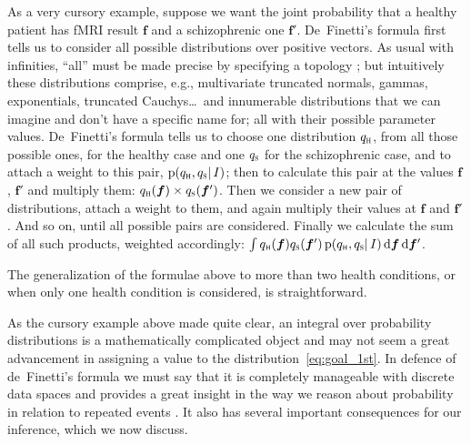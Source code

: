 \documentclass[%
]{frontiersSCNS-nologo} %
\newcommand*{\sect}{\S} %
\newcommand*{\eg}{e.g.}
\newcommand*{\cf}{{cf.}}
\newcommand*{\di}{\mathrm{d}}%
\newcommand*{\pf}{\mathrm{p}}%
\renewcommand*{\|}{\mathpunct{|}}%
\newcommand*{\yhu}{\textsc{h}}
\newcommand*{\yhd}{\textsc{s}}
\newcommand*{\yf}{\bm{f}}
\newcommand*{\yph}{q_{\yhu}}
\newcommand*{\yps}{q_{\yhd}}
\newcommand*{\yI}{I}
\begin{document}
As a very cursory example, suppose we want the joint probability that a
healthy patient has fMRI result $\yf$ and a schizophrenic one $\yf'$.
De~Finetti's formula first tells us to consider all possible distributions
over positive vectors. As usual with infinities, \enquote{all} must be made
precise by specifying a topology \citep[for details see
\eg][]{definetti1938,diaconisetal1981,aldous1985,diaconis1988}; but
intuitively these distributions comprise, \eg, multivariate truncated
normals, gammas, exponentials, truncated Cauchys\ldots\ and innumerable
distributions that we can imagine and don't have a specific name for; all
with their possible parameter values. De~Finetti's formula tells us to
choose one distribution $\yph$, from all those possible ones, for the
healthy case and one $\yps$ for the schizophrenic case, and to attach a
weight to this pair, $\pf(\yph,\yps \| \yI)$; then to calculate this pair
at the values $\yf$, $\yf'$ and multiply them: $\yph(\yf)\times\yps(\yf')$.
Then we consider a new pair of distributions, attach a weight to them, and
again multiply their values at $\yf$ and $\yf'$. And so on, until all
possible pairs are considered. Finally we calculate the sum of all such
products, weighted accordingly:
$\int \yph(\yf)\yps(\yf')\,\pf(\yph,\yps \| \yI)\,\di\yf\,\di\yf'$.


The generalization of the formulae above to more than two health
conditions, or when only one health condition is considered, is
straightforward.


As the cursory example above made quite clear, an integral over probability
distributions is a mathematically complicated object
\citep[\cf][]{ferguson1974} and may not seem a great advancement in
assigning a value to the distribution~\eqref{eq:goal_1st}. In defence of
de~Finetti's formula we must say that it is completely manageable with
discrete data spaces and provides a great insight in the way we reason
about probability in relation to repeated events
\cite[\sect~4.2]{definetti1937,lindleyetal1976,kingman1978,kochetal1982,dawid2013,bernardoetal1994_r2000}.
It also has several important consequences for our inference, which we now
discuss.
\end{document}
